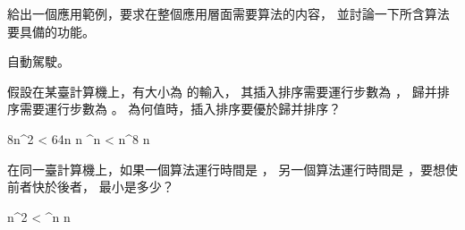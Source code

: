 \startsection[
  title={Algorithms as a technology},
]

\startEXERCISE
給出一個應用範例，要求在整個應用層面需要算法的内容，
並討論一下所含算法要具備的功能。
\stopEXERCISE

\startANSWER
自動駕駛。
\stopANSWER

\startEXERCISE
假設在某臺計算機上，有大小為  的輸入，
其插入排序需要運行步數為 ，
歸并排序需要運行步數為 。
 為何值時，插入排序要優於歸并排序？
\stopEXERCISE

\startANSWER
\startformula\startmathalignment[n=3,
  align={right,middle,left}]
\NC 8n^2   \NC <   \NC 64n \lg n \NR
{}^n    \NC <   \NC n^8 \NR
{}\le n \NC \le {}  \NR
\stopmathalignment\stopformula
\stopANSWER

\startEXERCISE
在同一臺計算機上，如果一個算法運行時間是 ，
另一個算法運行時間是 ，要想使前者快於後者，
 最小是多少？
\stopEXERCISE

\startANSWER
\startformula\startmathalignment[n=3,
  align={right,middle,left}]
 n^2   \NC <   ^n \NR
\NC       n   \NC \ge {} \NR
\stopmathalignment\stopformula
\stopANSWER

\stopsection
